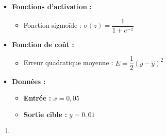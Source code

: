 {{\begin{itemize}
		\item \textbf{Fonctions d'activation :}
		\begin{itemize}
			\item Fonction sigmoïde : \( \sigma(z) = \dfrac{1}{1 + e^{-z}} \)
		\end{itemize}
		
		\item \textbf{Fonction de coût :}
		\begin{itemize}
			\item Erreur quadratique moyenne : \( E = \dfrac{1}{2}(y - \hat{y})^2 \)
		\end{itemize}
		
		\item \textbf{Données :}
		\begin{itemize}
			\item \textbf{Entrée :} \( x = 0{,}05 \)
			\item \textbf{Sortie cible :} \( y = 0{,}01 \)
		\end{itemize}
	\end{itemize}
 }

 \begin{enumerate}
	\item {}
\end{enumerate}}

